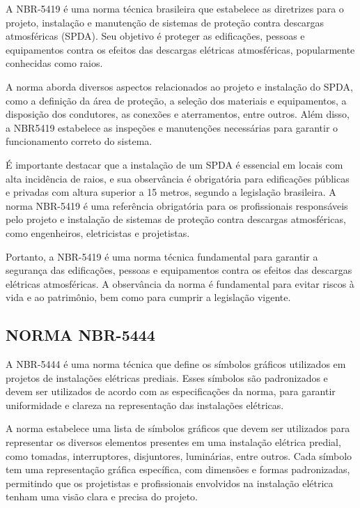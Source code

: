 A NBR-5419 é uma norma técnica brasileira que estabelece as diretrizes para o projeto, instalação e manutenção de sistemas de proteção contra descargas atmosféricas (SPDA). Seu objetivo é proteger as edificações, pessoas e equipamentos contra os efeitos das descargas elétricas atmosféricas, popularmente conhecidas como raios.

A norma aborda diversos aspectos relacionados ao projeto e instalação do SPDA, como a definição da área de proteção, a seleção dos materiais e equipamentos, a disposição dos condutores, as conexões e aterramentos, entre outros. Além disso, a NBR5419 estabelece as inspeções e manutenções necessárias para garantir o funcionamento correto do sistema.

É importante destacar que a instalação de um SPDA é essencial em locais com alta incidência de raios, e sua observância é obrigatória para edificações públicas e privadas com altura superior a 15 metros, segundo a legislação brasileira. A norma NBR-5419 é uma referência obrigatória para os profissionais responsáveis pelo projeto e instalação de sistemas de proteção contra descargas atmosféricas, como engenheiros, eletricistas e projetistas.

Portanto, a NBR-5419 é uma norma técnica fundamental para garantir a segurança das edificações, pessoas e equipamentos contra os efeitos das descargas elétricas atmosféricas. A observância da norma é fundamental para evitar riscos à vida e ao patrimônio, bem como para cumprir a legislação vigente.

\subsection{NORMA NBR-5444}

A NBR-5444 é uma norma técnica que define os símbolos gráficos utilizados em projetos de instalações elétricas prediais. Esses símbolos são padronizados e devem ser utilizados de acordo com as especificações da norma, para garantir uniformidade e clareza na representação das instalações elétricas.

A norma estabelece uma lista de símbolos gráficos que devem ser utilizados para representar os diversos elementos presentes em uma instalação elétrica predial, como tomadas, interruptores, disjuntores, luminárias, entre outros. Cada símbolo tem uma representação gráfica específica, com dimensões e formas padronizadas, permitindo que os projetistas e profissionais envolvidos na instalação elétrica tenham uma visão clara e precisa do projeto.

